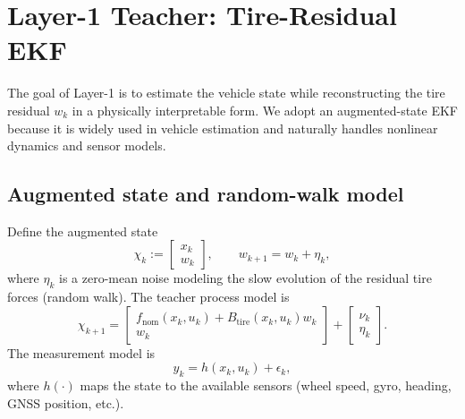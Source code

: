 \section{Layer-1 Teacher: Tire-Residual EKF}\label{ch4_sec_teacher}

The goal of Layer-1 is to estimate the vehicle state while reconstructing the tire residual $w_k$ in a physically interpretable form. We adopt an augmented-state EKF \cite{kalman1960new} because it is widely used in vehicle estimation and naturally handles nonlinear dynamics and sensor models.

\subsection{Augmented state and random-walk model}\label{ch4_subsec_augmented_ekf}
Define the augmented state
\begin{equation}
    \chi_k := \begin{bmatrix} x_k \\ w_k \end{bmatrix},
    \qquad
    w_{k+1} = w_k + \eta_k,
\end{equation}
where $\eta_k$ is a zero-mean noise modeling the slow evolution of the residual tire forces (random walk). The teacher process model is
\begin{equation}\label{eq:ch4_teacher_process}
    \chi_{k+1} =
    \begin{bmatrix}
        f_{\text{nom}}(x_k,u_k) + B_{\text{tire}}(x_k,u_k) w_k \\
        w_k
    \end{bmatrix}
    +
    \begin{bmatrix}
        \nu_k \\ \eta_k
    \end{bmatrix}.
\end{equation}
The measurement model is
\begin{equation}\label{eq:ch4_teacher_meas}
    y_k = h(x_k,u_k) + \epsilon_k,
\end{equation}
where $h(\cdot)$ maps the state to the available sensors (wheel speed, gyro, heading, GNSS position, etc.).

